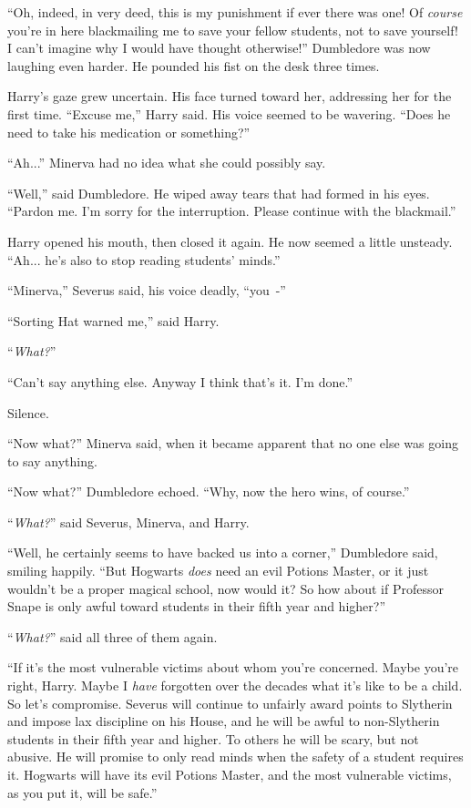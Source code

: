 ``Oh, indeed, in very deed, this is my punishment if ever there was one! Of \emph{course} you're in here blackmailing me to save your fellow students, not to save yourself! I can't imagine why I would have thought otherwise!'' Dumbledore was now laughing even harder. He pounded his fist on the desk three times.

Harry's gaze grew uncertain. His face turned toward her, addressing her for the first time. ``Excuse me,'' Harry said. His voice seemed to be wavering. ``Does he need to take his medication or something?''

``Ah...'' Minerva had no idea what she could possibly say.

``Well,'' said Dumbledore. He wiped away tears that had formed in his eyes. ``Pardon me. I'm sorry for the interruption. Please continue with the blackmail.''

Harry opened his mouth, then closed it again. He now seemed a little unsteady. ``Ah... he's also to stop reading students' minds.''

``Minerva,'' Severus said, his voice deadly, ``you~-''

``Sorting Hat warned me,'' said Harry.

``\emph{What?}''

``Can't say anything else. Anyway I think that's it. I'm done.''

Silence.

``Now what?'' Minerva said, when it became apparent that no one else was going to say anything.

``Now what?'' Dumbledore echoed. ``Why, now the hero wins, of course.''

``\emph{What?}'' said Severus, Minerva, and Harry.

``Well, he certainly seems to have backed us into a corner,'' Dumbledore said, smiling happily. ``But Hogwarts \emph{does} need an evil Potions Master, or it just wouldn't be a proper magical school, now would it? So how about if Professor Snape is only awful toward students in their fifth year and higher?''

``\emph{What?}'' said all three of them again.

``If it's the most vulnerable victims about whom you're concerned. Maybe you're right, Harry. Maybe I \emph{have} forgotten over the decades what it's like to be a child. So let's compromise. Severus will continue to unfairly award points to Slytherin and impose lax discipline on his House, and he will be awful to non-Slytherin students in their fifth year and higher. To others he will be scary, but not abusive. He will promise to only read minds when the safety of a student requires it. Hogwarts will have its evil Potions Master, and the most vulnerable victims, as you put it, will be safe.''

